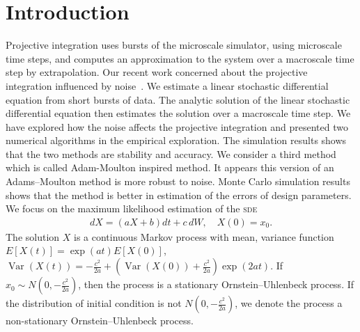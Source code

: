 \documentclass[12pt,reqno, a4paper]{article}
\numberwithin{equation}{section}
\begin{document}
\section{Introduction}
Projective integration uses bursts of the microscale simulator, using microscale time steps, and computes an approximation to the system over a macroscale time step by extrapolation.  Our recent work concerned about  the projective integration  influenced by  noise~\cite{Chen}.    We  estimate a linear stochastic differential equation  from short bursts of data. The analytic solution of the linear stochastic differential equation then estimates  the solution over a macroscale time step.  
We have  explored  how the noise affects the projective integration and presented  two numerical algorithms in the empirical exploration. The simulation results shows that the  two methods  are stability and accuracy. We consider a third method which is called Adam-Moulton inspired method.    It appears this version of an Adams--Moulton method is more robust to noise.
 Monte Carlo simulation results shows that  the method is better in  estimation of the errors of  design parameters.  We focus on the maximum likelihood estimation of the \textsc{sde}
\begin{eqnarray} \label{14}
dX=(aX+b)dt+c\,dW,   \quad  X(0)=x_0.
\end{eqnarray}
The solution  $X$ is a continuous Markov process with mean, variance function $E[X(t)]=\exp(at)E[X(0)]$, $\operatorname{Var}(X(t))=-\frac {c^2}{2a}+(\operatorname{Var}(X(0))+\frac {c^2}{2a})\exp(2at)$. If $x_0\sim N(0, -\frac {c^2}{2a})$, then  the process is a stationary  Ornstein--Uhlenbeck process. If the distribution of initial condition is not $ N(0, -\frac {c^2}{2a})$, we denote the process a  non-stationary Ornstein--Uhlenbeck process.
\end{document}
